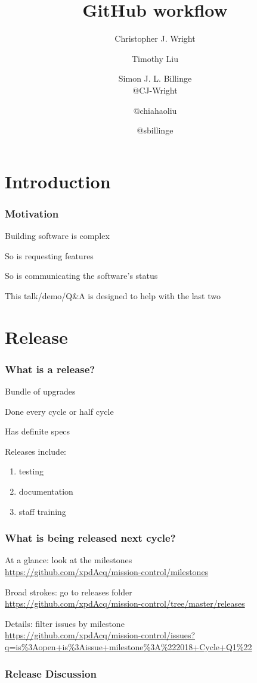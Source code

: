 \documentclass{beamer}
\title{GitHub workflow}
\author{Christopher J. Wright
\and Timothy Liu
\and Simon J. L. Billinge \\
@CJ-Wright
\and @chiahaoliu
\and @sbillinge
}
\begin{document}
\frame{\titlepage}

\section{Introduction}
\begin{frame}
    \frametitle{Motivation}
    \pause
    Building software is complex

    \pause
    So is requesting features

    \pause
    So is communicating the software's status

    \pause
    This talk/demo/Q\&A is designed to help with the last two
\end{frame}

\section{Release}
\begin{frame}
    \frametitle{What is a release?}
    Bundle of upgrades

    \pause
    Done every cycle or half cycle

    \pause
    Has definite specs

    \pause
    Releases include:
    \begin{enumerate}
        \pause
        \item testing
        \pause
        \item documentation
        \pause
        \item staff training
    \end{enumerate}
\end{frame}

\begin{frame}
    \frametitle{What is being released next cycle?}
    \pause
    At a glance: look at the milestones\\
    \url{https://github.com/xpdAcq/mission-control/milestones}

    \pause
    Broad strokes: go to releases folder\\
    \url{https://github.com/xpdAcq/mission-control/tree/master/releases}

    \pause
    Details: filter issues by milestone\\
    \url{https://github.com/xpdAcq/mission-control/issues?q=is\%3Aopen+is\%3Aissue+milestone\%3A\%222018+Cycle+Q1\%22}
\end{frame}

\begin{frame}
\frametitle{Release Discussion}
\end{frame}
\end{document}

